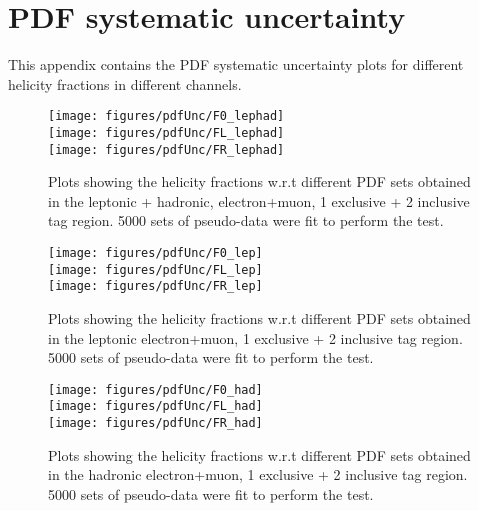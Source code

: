 \clearpage
\section{PDF systematic uncertainty}
\label{app:pdfSyst}
This appendix contains the PDF systematic uncertainty plots for different helicity fractions in different channels.

\begin{figure}[!hb]    
      \begin{center}         
        \texttt{[image: figures/pdfUnc/F0\_lephad]}\\
        \texttt{[image: figures/pdfUnc/FL\_lephad]}\\
        \texttt{[image: figures/pdfUnc/FR\_lephad]}\\
        \caption{Plots showing the helicity fractions w.r.t different PDF sets obtained in the leptonic + hadronic, electron+muon, 1 exclusive + 2 inclusive \bt tag region. 5000 sets of pseudo-data were fit to perform the test.}
  \label{fig:pdf_lephad}
      \end{center}
     \end{figure}

     \begin{figure}[!hb]    
      \begin{center}         
        \texttt{[image: figures/pdfUnc/F0\_lep]}\\
        \texttt{[image: figures/pdfUnc/FL\_lep]}\\
        \texttt{[image: figures/pdfUnc/FR\_lep]}\\
        \caption{Plots showing the helicity fractions w.r.t different PDF sets obtained in the leptonic electron+muon, 1 exclusive + 2 inclusive \bt tag region. 5000 sets of pseudo-data were fit to perform the test.}
  \label{fig:pdf_lep}
      \end{center}
     \end{figure}


     \begin{figure}[!hb]    
      \begin{center}         
        \texttt{[image: figures/pdfUnc/F0\_had]}\\
        \texttt{[image: figures/pdfUnc/FL\_had]}\\
        \texttt{[image: figures/pdfUnc/FR\_had]}\\
        \caption{Plots showing the helicity fractions w.r.t different PDF sets obtained in the hadronic electron+muon, 1 exclusive + 2 inclusive \bt tag region. 5000 sets of pseudo-data were fit to perform the test.}
  \label{fig:pdf_had}
      \end{center}
     \end{figure}